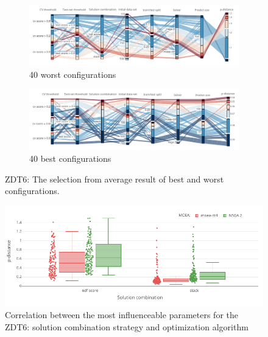    \begin{figure}
        \centering
        \begin{subfigure}{\textwidth}
            \includegraphics[width=\textwidth]{content/images/conf_zdt6_worst}
            \caption{40 worst configurations}
            \label{fig:conf_zdt6_worst}
        \end{subfigure} 
        
        \begin{subfigure}{\textwidth}
            \includegraphics[width=\textwidth]{content/images/conf_zdt6_best}
            \caption{40 best configurations}
            \label{fig:conf_zdt6_best}
        \end{subfigure} 

        \caption[ZDT6: The selection from average result of best and worst configurations.]{ZDT6: The selection from average result of best and worst configurations.}
        \label{fig:conf_zdt6}    
    \end{figure}

    \begin{figure}
        \centering

        \includegraphics[width=\textwidth]{content/images/conf_zdt6_solver}

        \caption[Correlation between the most influenceable parameters for the ZDT4]{Correlation between the most influenceable parameters for the ZDT6: solution combination strategy and optimization algorithm}
        \label{fig:conf_zdt6}    
    \end{figure}


